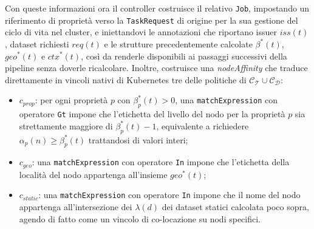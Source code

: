 Con queste informazioni ora il controller costruisce il relativo \texttt{Job}, impostando un riferimento di proprietà verso la \texttt{TaskRequest} di origine per la sua gestione del ciclo di vita nel cluster, e iniettandovi le annotazioni che riportano issuer $iss(t)$, dataset richiesti $req(t)$ e le strutture precedentemente calcolate $\beta^*(t)$, $geo^*(t)$ e $ctx^*(t)$, così da renderle disponibili ai passaggi successivi della pipeline senza doverle ricalcolare. Inoltre, costruisce una \emph{nodeAffinity} che traduce direttamente in vincoli nativi di Kubernetes tre delle politiche di $\mathcal{C_T} \cup \mathcal{C_D}$:

\begin{itemize}
    \item $c_{prop}$: per ogni proprietà $p$ con $\beta^*_p(t) > 0$, una \texttt{matchExpression} con operatore \texttt{Gt} impone che l'etichetta del livello del nodo per la proprietà $p$ sia strettamente maggiore di $\beta^*_p(t) - 1$, equivalente a richiedere $\alpha_p(n) \geq \beta^*_p(t)$ trattandosi di valori interi;
    \item $c_{geo}$: una \texttt{matchExpression} con operatore \texttt{In} impone che l'etichetta della località del nodo appartenga all'insieme $geo^*(t)$;
    \item $c_{static}$: una \texttt{matchExpression} con operatore \texttt{In} impone che il nome del nodo appartenga all'intersezione dei $\lambda(d)$ dei dataset statici calcolata poco sopra, agendo di fatto come un vincolo di co-locazione su nodi specifici.
\end{itemize}

